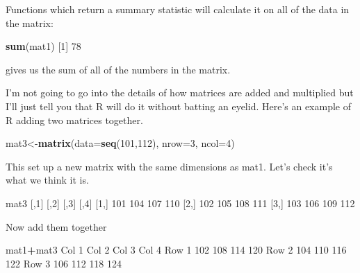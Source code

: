 \documentclass[
]{book}
\newenvironment{Shaded}{\begin{snugshade}}{\end{snugshade}}
\newcommand{\DataTypeTok}[1]{\textcolor[rgb]{0.13,0.29,0.53}{#1}}
\newcommand{\DecValTok}[1]{\textcolor[rgb]{0.00,0.00,0.81}{#1}}
\newcommand{\KeywordTok}[1]{\textcolor[rgb]{0.13,0.29,0.53}{\textbf{#1}}}
\newcommand{\NormalTok}[1]{#1}
\newcommand{\OperatorTok}[1]{\textcolor[rgb]{0.81,0.36,0.00}{\textbf{#1}}}
\begin{document}
Functions which return a summary statistic will calculate it on all of the data in the matrix:

\begin{Shaded}
\begin{Highlighting}[]
\KeywordTok{sum}\NormalTok{(mat1)}
\NormalTok{[}\DecValTok{1}\NormalTok{] }\DecValTok{78}
\end{Highlighting}
\end{Shaded}

gives us the sum of all of the numbers in the matrix.

I'm not going to go into the details of how matrices are added and multiplied but I'll just tell you that R will do it without batting an eyelid. Here's an example of R adding two matrices together.

\begin{Shaded}
\begin{Highlighting}[]
\NormalTok{mat3<-}\KeywordTok{matrix}\NormalTok{(}\DataTypeTok{data=}\KeywordTok{seq}\NormalTok{(}\DecValTok{101}\NormalTok{,}\DecValTok{112}\NormalTok{), }\DataTypeTok{nrow=}\DecValTok{3}\NormalTok{, }\DataTypeTok{ncol=}\DecValTok{4}\NormalTok{)}
\end{Highlighting}
\end{Shaded}

This set up a new matrix with the same dimensions as mat1. Let's check it's what we think it is.

\begin{Shaded}
\begin{Highlighting}[]
\NormalTok{mat3}
\NormalTok{     [,}\DecValTok{1}\NormalTok{] [,}\DecValTok{2}\NormalTok{] [,}\DecValTok{3}\NormalTok{] [,}\DecValTok{4}\NormalTok{]}
\NormalTok{[}\DecValTok{1}\NormalTok{,]  }\DecValTok{101}  \DecValTok{104}  \DecValTok{107}  \DecValTok{110}
\NormalTok{[}\DecValTok{2}\NormalTok{,]  }\DecValTok{102}  \DecValTok{105}  \DecValTok{108}  \DecValTok{111}
\NormalTok{[}\DecValTok{3}\NormalTok{,]  }\DecValTok{103}  \DecValTok{106}  \DecValTok{109}  \DecValTok{112}
\end{Highlighting}
\end{Shaded}

Now add them together

\begin{Shaded}
\begin{Highlighting}[]
\NormalTok{mat1}\OperatorTok{+}\NormalTok{mat3}
\NormalTok{      Col }\DecValTok{1}\NormalTok{ Col }\DecValTok{2}\NormalTok{ Col }\DecValTok{3}\NormalTok{ Col }\DecValTok{4}
\NormalTok{Row }\DecValTok{1}   \DecValTok{102}   \DecValTok{108}   \DecValTok{114}   \DecValTok{120}
\NormalTok{Row }\DecValTok{2}   \DecValTok{104}   \DecValTok{110}   \DecValTok{116}   \DecValTok{122}
\NormalTok{Row }\DecValTok{3}   \DecValTok{106}   \DecValTok{112}   \DecValTok{118}   \DecValTok{124}
\end{Highlighting}
\end{Shaded}
\end{document}
